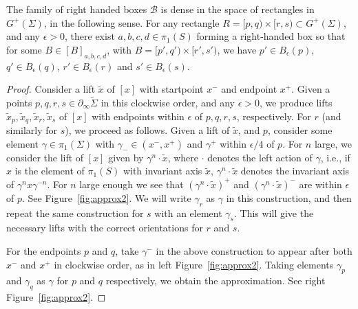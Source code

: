 \begin{proposition}
The family of right handed boxes $\mathcal{B}$ is dense in the space
of rectangles in $G^+(\Sigma)$, in the following sense.
For any rectangle $R = [p,q) \times [r,s) \subset G^+(\Sigma)$,
and any $\epsilon>0$, there exist $a,b,c,d \in \pi_1(S)$ forming a
right-handed box so that for some $B \in [B]_{a,b,c,d}$, with
$B=[p',q') \times [r',s')$, we have $p' \in B_{\epsilon}(p)$, $q' \in
B_{\epsilon}(q)$, $r' \in B_{\epsilon}(r)$ and $s' \in
B_{\epsilon}(s)$.
\label{prop:density}
\end{proposition}
\begin{proof}
   Consider a lift $\tilde{x}$ of $[x]$ with startpoint $x^-$ and endpoint $x^+$.
   Given a points $p,q,r,s \in \partial_{\infty} \tilde{\Sigma}$ in this clockwise order, and any $\epsilon>0$, we produce lifts $\tilde{x}_p,\tilde{x}_q,\tilde{x}_r,\tilde{x}_s$ of $[x]$ with endpoints within $\epsilon$ of $p,q,r,s$, respectively.
   For $r$ (and similarly for $s$), we proceed as follows. Given a lift of $\tilde{x}$, and $p$, consider some element $\gamma \in \pi_1(\Sigma)$ with $\gamma_- \in (x^-, x^+)$ and $\gamma^+$ within $\epsilon/4$ of $p$. For $n$ large, we consider the lift of $[x]$ given by $\gamma^n \cdot \tilde{x}$, where $\cdot$ denotes the left action of $\gamma$, i.e., if $x$ is the element of $\pi_1(S)$ with invariant axis $\tilde{x}$, $\gamma^n \cdot \tilde{x}$ denotes the invariant axis of $\gamma^n x \gamma^{-n}$. For $n$ large enough we see that $(\gamma^n \cdot \tilde{x})^+$ and  $(\gamma^n \cdot \tilde{x})^-$ are within $\epsilon$ of $p$.   See Figure~\ref{fig:approx2}.
   We will write $\gamma_r$ as $\gamma$ in this construction, and then repeat the same construction for $s$ with an element $\gamma_s$.
   This will give the necessary lifts with the correct orientations
   for $r$ and $s$.

\begin{figure}
\end{figure}

For the endpoints $p$ and $q$, take $\gamma^{-}$ in the above construction to appear after both $x^{-}$ and $x^{+}$ in clockwise order, as in left Figure~\ref{fig:approx2}. 
Taking elements $\gamma_p$ and $\gamma_q$ as $\gamma$ for $p$ and $q$ respectively, we obtain the approximation. See right Figure~\ref{fig:approx2}.
\end{proof}

